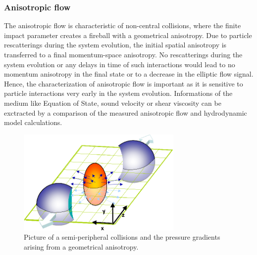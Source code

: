 \subsubsection{Anisotropic flow}
\label{sec:AnisotropicFlow}
The anisotropic flow is characteristic of non-central collisions, where the finite impact parameter creates a fireball with a geometrical anisotropy. Due to particle rescatterings during the system evolution, the initial spatial anisotropy is transferred to a final momentum-space anisotropy. No rescatterings during the system evolution or any delays in time of such interactions would lead to no momentum anisotropy in the final state or to a decrease in the elliptic flow signal. Hence, the characterization of anisotropic flow is important as it is sensitive to particle interactions very early in the system evolution. Informations of the medium like Equation of State, sound velocity or shear viscosity can be exctracted by a comparison of the measured anisotropic flow and hydrodynamic model calculations.
\begin{figure}[!ht]
  \centering
  \includegraphics[width=8cm]{FigCap1/elliptic_flow_3D_medium.png}
  \caption{Picture of a semi-peripheral collisions and the pressure gradients arising from a geometrical anisotropy.}
  \label{fig:elliptic_flow_3D_medium}
\end{figure}

